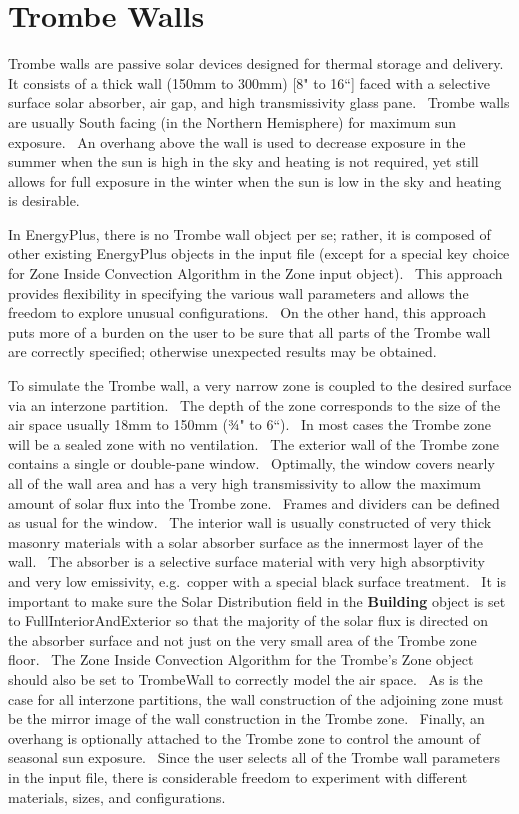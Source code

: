 \section{Trombe Walls }\label{trombe-walls}

Trombe walls are passive solar devices designed for thermal storage and delivery.~ It consists of a thick wall (150mm to 300mm) {[}8" to 16``{]} faced with a selective surface solar absorber, air gap, and high transmissivity glass pane.~ Trombe walls are usually South facing (in the Northern Hemisphere) for maximum sun exposure.~ An overhang above the wall is used to decrease exposure in the summer when the sun is high in the sky and heating is not required, yet still allows for full exposure in the winter when the sun is low in the sky and heating is desirable.

In EnergyPlus, there is no Trombe wall object per se; rather, it is composed of other existing EnergyPlus objects in the input file (except for a special key choice for Zone Inside Convection Algorithm in the Zone input object).~ This approach provides flexibility in specifying the various wall parameters and allows the freedom to explore unusual configurations.~ On the other hand, this approach puts more of a burden on the user to be sure that all parts of the Trombe wall are correctly specified; otherwise unexpected results may be obtained.

To simulate the Trombe wall, a very narrow zone is coupled to the desired surface via an interzone partition.~ The depth of the zone corresponds to the size of the air space usually 18mm to 150mm (¾" to 6``).~ In most cases the Trombe zone will be a sealed zone with no ventilation.~ The exterior wall of the Trombe zone contains a single or double-pane window.~ Optimally, the window covers nearly all of the wall area and has a very high transmissivity to allow the maximum amount of solar flux into the Trombe zone.~ Frames and dividers can be defined as usual for the window.~ The interior wall is usually constructed of very thick masonry materials with a solar absorber surface as the innermost layer of the wall.~ The absorber is a selective surface material with very high absorptivity and very low emissivity, e.g.~copper with a special black surface treatment.~ It is important to make sure the Solar Distribution field in the \textbf{Building} object is set to FullInteriorAndExterior so that the majority of the solar flux is directed on the absorber surface and not just on the very small area of the Trombe zone floor. ~The Zone Inside Convection Algorithm for the Trombe's Zone object should also be set to TrombeWall to correctly model the air space.~ As is the case for all interzone partitions, the wall construction of the adjoining zone must be the mirror image of the wall construction in the Trombe zone.~ Finally, an overhang is optionally attached to the Trombe zone to control the amount of seasonal sun exposure.~ Since the user selects all of the Trombe wall parameters in the input file, there is considerable freedom to experiment with different materials, sizes, and configurations.

